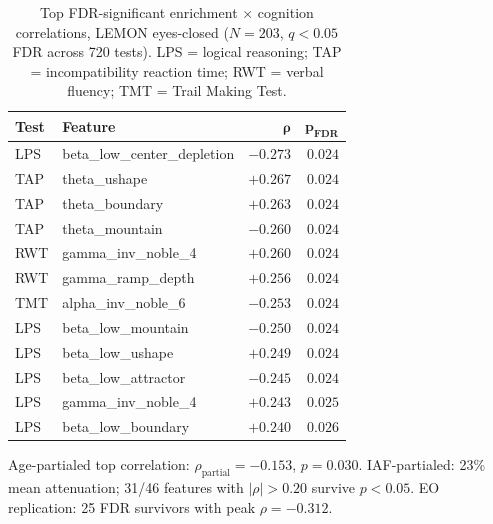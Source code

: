 \begin{table}[htbp]
\centering
\caption{Top FDR-significant enrichment $\times$ cognition correlations, LEMON eyes-closed ($N = 203$, $q < 0.05$ FDR across 720 tests). LPS = logical reasoning; TAP = incompatibility reaction time; RWT = verbal fluency; TMT = Trail Making Test.}
\label{tab:cog_top}
\begin{threeparttable}
\begin{tabular}{llrr}
\toprule
\textbf{Test} & \textbf{Feature} & $\boldsymbol{\rho}$ & $\boldsymbol{p_\text{FDR}}$ \\
\midrule
LPS   & beta\_low\_center\_depletion  & $-0.273$ & $0.024$ \\
TAP   & theta\_ushape                  & $+0.267$ & $0.024$ \\
TAP   & theta\_boundary                & $+0.263$ & $0.024$ \\
TAP   & theta\_mountain                & $-0.260$ & $0.024$ \\
RWT   & gamma\_inv\_noble\_4           & $+0.260$ & $0.024$ \\
RWT   & gamma\_ramp\_depth             & $+0.256$ & $0.024$ \\
TMT   & alpha\_inv\_noble\_6           & $-0.253$ & $0.024$ \\
LPS   & beta\_low\_mountain            & $-0.250$ & $0.024$ \\
LPS   & beta\_low\_ushape              & $+0.249$ & $0.024$ \\
LPS   & beta\_low\_attractor           & $-0.245$ & $0.024$ \\
LPS   & gamma\_inv\_noble\_4           & $+0.243$ & $0.025$ \\
LPS   & beta\_low\_boundary            & $+0.240$ & $0.026$ \\
\bottomrule
\end{tabular}
\begin{tablenotes}
  \small
  \item Age-partialed top correlation: $\rho_\text{partial} = -0.153$, $p = 0.030$.
        IAF-partialed: 23\% mean attenuation; 31/46 features with $|\rho| > 0.20$ survive $p < 0.05$.
        EO replication: 25 FDR survivors with peak $\rho = -0.312$.
\end{tablenotes}
\end{threeparttable}
\end{table}

